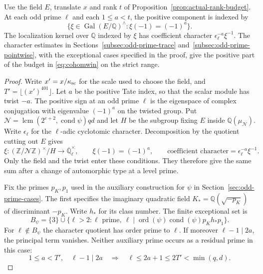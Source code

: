 \begin{lemma}\label{lem:strict-character-budget}
Use the field \(E\), translate \(x\) and rank \(t\) of
Proposition~\ref{prop:actual-rank-budget}. At each odd prime \(\ell\) and each \(1\le a<t\), the positive component is indexed by
\[
 \{\xi\in\operatorname{Gal}(E/\mathbb Q)^\wedge:\xi(-1)=(-1)^a\}.
\]
The localization kernel over \(\mathbb Q\) indexed by \(\xi\) has coefficient character \(\epsilon_\ell^{-a}\xi^{-1}\).
The character estimates in Sections~\ref{subsec:odd-prime-trace}
and~\ref{subsec:odd-prime-pointwise}, with the exceptional cases
specified in the proof, give the positive part of the budget in
\eqref{eq:cohomwin} on the strict range.
\end{lemma}
\begin{proof}
Write \(x'=x/\kappa_{\rm sc}\) for the scale used to choose the field, and
\(T'=\lfloor(x')^{401}\rfloor\). Let \(a\) be the positive Tate
index, so that the scalar module has twist \(-a\).
The positive sign at an odd prime \(\ell\) is the eigenspace
of complex conjugation with eigenvalue \((-1)^a\) on the
twisted group. Put \(\mathcal N=\operatorname{lcm}(2^{e+2},
\operatorname{cond}\psi)qd\) and let \(H\) be the subgroup
fixing \(E\) inside \(\mathbb Q(\mu_{\mathcal N})\). Write
\(\epsilon_\ell\) for the \(\ell\)-adic cyclotomic character.
Decomposition by the quotient cutting out \(E\) gives
\[
 \xi\colon (\mathbb Z/\mathcal N\mathbb Z)^\times/H\longrightarrow
 \overline{\mathbb Q}_\ell^\times,\qquad
 \xi(-1)=(-1)^a,\qquad
 \text{coefficient character}=\epsilon_\ell^{-a}\xi^{-1}.
\]
Only the field and the twist enter these conditions. They therefore
give the same sum after a change of automorphic type at a level prime.

Fix the primes \(p_K,p_1\) used in the auxiliary construction
for \(\psi\) in Section~\ref{sec:odd-prime-cases}. The first
specifies the imaginary quadratic field \(K_*=\mathbb Q(\sqrt{-p_K})\)
of discriminant \(-p_K\). Write \(h_*\) for its class number.
The finite exceptional set is
\[
 B_\psi=\{3\}\cup\{\ell>2:\ell\text{ prime},\
                \ell\mid \operatorname{ord}(\psi)\operatorname{cond}(\psi)p_Kh_*p_1\}.
\]
For \(\ell\notin B_\psi\) the character quotient has order
prime to \(\ell\). If moreover \(\ell-1\mid2a\), the principal term vanishes. Neither auxiliary prime occurs as a residual prime in this case:
\[
 1\le a<T',\quad \ell-1\mid2a\quad\Longrightarrow\quad
 \ell\le 2a+1\le2T'<\min(q,d).
\]


\end{proof}
